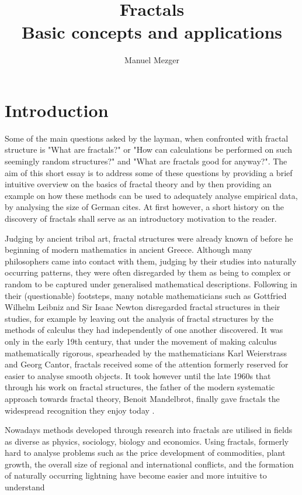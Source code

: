 \documentclass{article}[12pt]
\begin{document}
\title{Fractals \\ \large Basic concepts and applications}
\author{Manuel Mezger}

\maketitle

\tableofcontents

\section{Introduction}
Some of the main questions asked by the layman, when confronted with fractal structure is "What are fractals?" or "How can calculations be performed on such seemingly random structures?" and "What are fractals good for anyway?".  The aim of this short essay is to address some of these questions by providing a brief intuitive overview on the basics of fractal theory and by then providing an example on how these methods can be used to adequately analyse empirical data, by analysing the size of German cites. At first however, a short history on the discovery of fractals shall serve as an introductory motivation to the reader.

Judging by ancient tribal art, fractal structures were already known of before he beginning of modern mathematics in ancient Greece. Although many philosophers came into contact with them, judging by their studies into naturally occurring patterns, they were often disregarded by them as being to complex or random to be captured under generalised mathematical descriptions. Following in their (questionable) footsteps, many notable mathematicians such as Gottfried Wilhelm Leibniz and Sir Isaac Newton disregarded fractal structures in their studies, for example by leaving out the analysis of fractal structures by the methods of calculus they had independently of one another discovered. It was only in the early 19th century, that under the movement of making calculus mathematically rigorous, spearheaded by the mathematicians Karl Weierstrass and Georg Cantor, fractals received some of the attention formerly reserved for easier to analyse smooth objects. It took however until the late 1960s that through his work on fractal structures, the father of the modern systematic approach towards fractal theory, Benoit Mandelbrot, finally gave fractals the widespread recognition they enjoy today \citep{falconer2013fractals}.

Nowadays methods developed through research into fractals are utilised in fields as diverse as physics, sociology, biology and economics. Using fractals, formerly hard to analyse problems such as the price development of commodities, plant growth, the overall size of regional and international conflicts, and the formation of naturally occurring lightning have become easier and more intuitive to understand \citep{liebovitch1998fractals, cioffi2013power, takayasu2000fractal}
\end{document}
